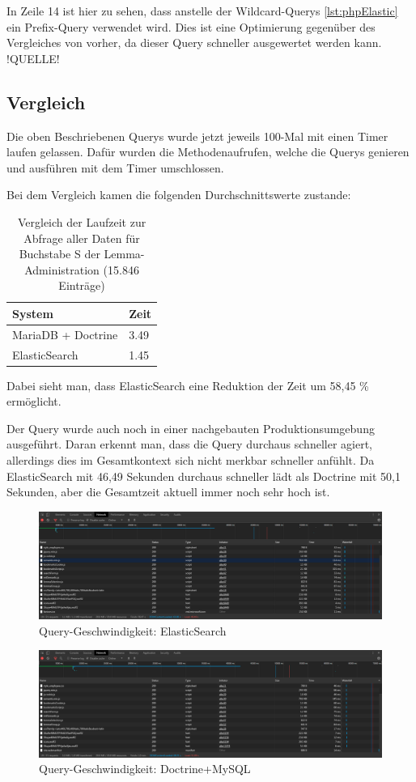 In Zeile 14 ist hier zu sehen, dass anstelle der Wildcard-Querys \ref{lst:phpElastic} ein Prefix-Query verwendet wird. Dies ist eine Optimierung gegenüber des Vergleiches von vorher, da dieser Query schneller ausgewertet werden kann. !QUELLE!


\subsection{Vergleich}

Die oben Beschriebenen Querys wurde jetzt jeweils 100-Mal mit einen Timer laufen gelassen. 
Dafür wurden die Methodenaufrufen, welche die Querys genieren und ausführen mit dem Timer umschlossen. 

Bei dem Vergleich kamen die folgenden Durchschnittswerte zustande:
\begin{table} %
	\centering
		\begin{tabular}{l | l }
		    \textbf{System} & \textbf{Zeit} \\
        \hline
        MariaDB + Doctrine & 3.49 \\
        ElasticSearch      & 1.45  \\
		\end{tabular}
    \caption{Vergleich der Laufzeit zur Abfrage aller Daten für Buchstabe S der Lemma-Administration (15.846 Einträge)}
    \label{vlgTimeDBvsEla}
\end{table}

Dabei sieht man, dass ElasticSearch eine Reduktion der Zeit um 58,45 \% ermöglicht.

Der Query wurde auch noch in einer nachgebauten Produktionsumgebung ausgeführt. Daran erkennt man, dass die Query durchaus schneller agiert, allerdings dies im Gesamtkontext sich nicht merkbar schneller anfühlt. Da ElasticSearch mit 46,49 Sekunden durchaus schneller lädt als Doctrine mit 50,1 Sekunden, aber die Gesamtzeit aktuell immer noch sehr hoch ist.

\begin{figure}
	\centering
	\includegraphics[width=1\linewidth]{images/setup/query/time_prod_ela.png}
	\caption{Query-Geschwindigkeit: ElasticSearch}
	\label{img:timeProdEla}
\end{figure}

\begin{figure}
	\centering
	\includegraphics[width=1\linewidth]{images/setup/query/time_prod_db.png}
	\caption{Query-Geschwindigkeit: Doctrine+MySQL}
	\label{img:timeProdDb}
\end{figure}